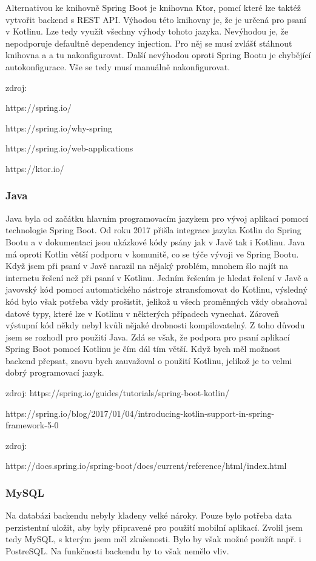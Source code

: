 Alternativou ke knihovně Spring Boot je knihovna Ktor, pomcí které lze taktéž vytvořit backend s REST API. Výhodou této knihovny je, že je určená pro psaní v Kotlinu. Lze tedy využít všechny výhody tohoto jazyka. Nevýhodou je, že nepodporuje defaultně dependency injection. Pro něj se musí zvlášť stáhnout knihovna a a tu nakonfigurovat. Další nevýhodou oproti Spring Bootu je chybějící autokonfigurace. Vše se tedy musí manuálně nakonfigurovat.

zdroj:

https://spring.io/

https://spring.io/why-spring

https://spring.io/web-applications

https://ktor.io/

\subsubsection*{Java}
Java byla od začátku hlavním programovacím jazykem pro vývoj aplikací pomocí technologie Spring Boot. Od roku 2017 přišla integrace jazyka Kotlin do Spring Bootu a v dokumentaci jsou ukázkové kódy psány jak v Javě tak i Kotlinu. Java má oproti Kotlin větší podporu v komunitě, co se týče vývoji ve Spring Bootu. Když jsem při psaní v Javě narazil na nějaký problém, mnohem šlo najít na internetu řešení než při psaní v Kotlinu. Jedním řešením je hledat řešení v Javě a javovský kód pomocí automatického nástroje ztransfomovat do Kotlinu, výsledný kód bylo však potřeba vždy prošistit, jelikož u všech proměnných vždy obsahoval datové typy, které lze v Kotlinu v některých případech vynechat. Zároveň výstupní kód někdy nebyl kvůli nějaké drobnosti kompilovatelný. Z toho důvodu jsem se rozhodl pro použití Java. Zdá se však, že podpora pro psaní aplikací Spring Boot pomocí Kotlinu je čím dál tím větší. Když bych měl možnost backend přepsat, znovu bych zauvažoval o použití Kotlinu, jelikož je to velmi dobrý programovací jazyk.

zdroj:
 https://spring.io/guides/tutorials/spring-boot-kotlin/

https://spring.io/blog/2017/01/04/introducing-kotlin-support-in-spring-framework-5-0

zdroj:

https://docs.spring.io/spring-boot/docs/current/reference/html/index.html\textbf{}

\subsubsection*{MySQL}
Na databázi backendu nebyly kladeny velké nároky. Pouze bylo potřeba data perzistentní uložit, aby byly připravené pro použití mobilní aplikací. Zvolil jsem tedy MySQL, s kterým jsem měl zkušenosti. Bylo by však možné použít např. i PostreSQL. Na funkčnosti backendu by to však nemělo vliv.

